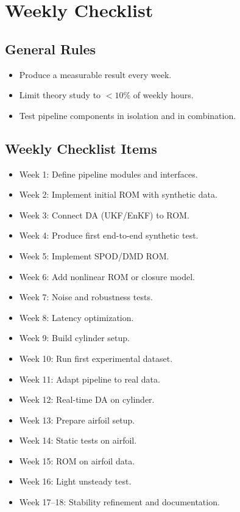 
\section*{Weekly Checklist}
\subsection*{General Rules}
\begin{itemize}
\item Produce a measurable result every week.
\item Limit theory study to $<10\%$ of weekly hours.
\item Test pipeline components in isolation and in combination.
\end{itemize}

\subsection*{Weekly Checklist Items}
\begin{itemize}
\item Week 1: Define pipeline modules and interfaces.
\item Week 2: Implement initial ROM with synthetic data.
\item Week 3: Connect DA (UKF/EnKF) to ROM.
\item Week 4: Produce first end-to-end synthetic test.
\item Week 5: Implement SPOD/DMD ROM.
\item Week 6: Add nonlinear ROM or closure model.
\item Week 7: Noise and robustness tests.
\item Week 8: Latency optimization.
\item Week 9: Build cylinder setup.
\item Week 10: Run first experimental dataset.
\item Week 11: Adapt pipeline to real data.
\item Week 12: Real-time DA on cylinder.
\item Week 13: Prepare airfoil setup.
\item Week 14: Static tests on airfoil.
\item Week 15: ROM on airfoil data.
\item Week 16: Light unsteady test.
\item Week 17--18: Stability refinement and documentation.
\end{itemize}
